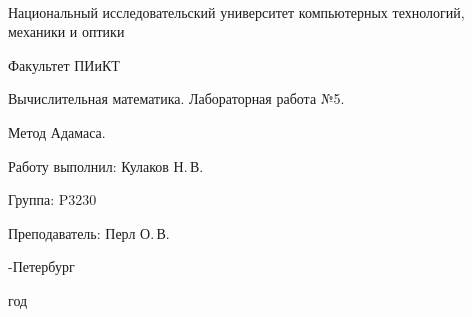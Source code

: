 \thispagestyle{empty}

\onecolumn
\begin{center}
	\
\vspace{1 cm}

\huge Национальный исследовательский университет компьютерных технологий, механики и оптики
\vspace{0.5cm}

\Huge Факультет ПИиКТ


\vspace{5cm}
\huge Вычислительная математика. Лабораторная работа №5.
\vspace{0.2cm}

\LARGE Метод Адамаса.
\end{center}
\vspace{5 cm}

\begin{flushright}
\Large

Работу выполнил: Кулаков Н.\,В.
\smallskip

Группа: P3230
\smallskip

Преподаватель: Перл О.\,В.
\smallskip

\vspace{4cm}
	
-Петербург

 год
\end{flushright}
